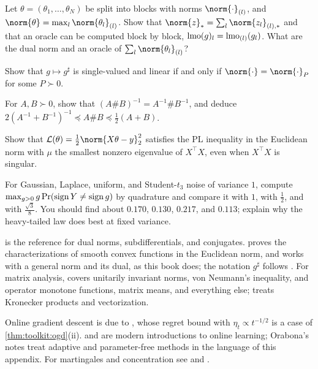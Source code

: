 \begin{refsection}
\begin{exercises}
\item \consolidation Let $\theta=(\theta_1,\dots,\theta_N)$ be split into blocks with norms $\norm{\cdot}_{(l)}$, and $\norm{\theta}=\max_l\norm{\theta_l}_{(l)}$. Show that $\norm{z}_*=\sum_l\norm{z_l}_{(l),*}$ and that an oracle can be computed block by block, $\operatorname{lmo}(g)_l=\operatorname{lmo}_{(l)}(g_l)$. What are the dual norm and an oracle of $\sum_l\norm{\theta_l}_{(l)}$?\label{ex:toolkit:product}
\item \consolidation\hard Show that $g\mapsto g^\sharp$ is single-valued and linear if and only if $\norm{\cdot}=\norm{\cdot}_P$ for some $P\succ0$. 
\item \consolidation For $A,B\succ0$, show that $(A\#B)^{-1}=A^{-1}\#B^{-1}$, and deduce $2(A^{-1}+B^{-1})^{-1}\preceq A\#B\preceq\frac12(A+B)$.\label{ex:toolkit:means}
\item \consolidation Show that $\Loss(\theta)=\frac12\norm{X\theta-y}_2^2$ satisfies the PL inequality in the Euclidean norm with $\mu$ the smallest nonzero eigenvalue of $X^\top X$, even when $X^\top X$ is singular. \label{ex:toolkit:lsq}
\item \simulation For Gaussian, Laplace, uniform, and Student-$t_3$ noise of variance $1$, compute $\max_{g>0}g\Pr(\operatorname{sign} Y\ne\operatorname{sign} g)$ by quadrature and compare it with $1$, with $\frac12$, and with $\frac{\sqrt3}8$. You should find about $0.170$, $0.130$, $0.217$, and $0.113$; explain why the heavy-tailed law does best at fixed variance.
\end{exercises}

\notesandrefs

\textcite{Rockafellar1970} is the reference for dual norms, subdifferentials, and conjugates. \textcite[Section~2.1]{Nesterov2018} proves the characterizations of smooth convex functions in the Euclidean norm, and \textcite{Beck2017} works with a general norm and its dual, as this book does; the notation $g^\sharp$ follows \textcite{KelnerEtAl2014}. For matrix analysis, \textcite{Bhatia1997} covers unitarily invariant norms, von Neumann's inequality, and operator monotone functions, \textcite{Bhatia2007} matrix means, and \textcite{HornJohnson2013} everything else; \textcite[Chapter~4]{HornJohnson1991} treats Kronecker products and vectorization.

Online gradient descent is due to \textcite{Zinkevich2003}, whose regret bound with $\eta_t\propto t^{-1/2}$ is a case of \cref{thm:toolkit:ogd}(ii). \textcite{Hazan2016} and \textcite{Orabona2019} are modern introductions to online learning; Orabona's notes treat adaptive and parameter-free methods in the language of this appendix. For martingales and concentration see \textcite{Williams1991} and \textcite{BoucheronLugosiMassart2013}.

\printchapterbib
\end{refsection}
